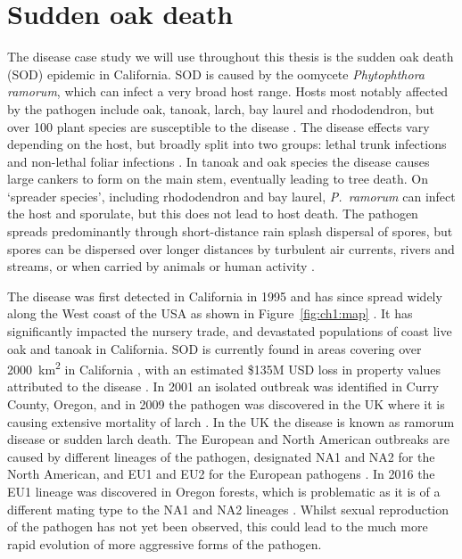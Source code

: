 \section{Sudden oak death}

The disease case study we will use throughout this thesis is the sudden oak death (SOD) epidemic in California. SOD is caused by the oomycete \emph{Phytophthora ramorum}, which can infect a very broad host range. Hosts most notably affected by the pathogen include oak, tanoak, larch, bay laurel and rhododendron, but over 100 plant species are susceptible to the disease \citep{grunwald_emergence_2012}. The disease effects vary depending on the host, but broadly split into two groups: lethal trunk infections and non-lethal foliar infections \citep{rizzo_sudden_2003}. In tanoak and oak species the disease causes large cankers to form on the main stem, eventually leading to tree death. On `spreader species', including rhododendron and bay laurel, \emph{P.~ramorum} can infect the host and sporulate, but this does not lead to host death. The pathogen spreads predominantly through short-distance rain splash dispersal of spores, but spores can be dispersed over longer distances by turbulent air currents, rivers and streams, or when carried by animals or human activity \citep{grunwald_emergence_2012}.

The disease was first detected in California in 1995 and has since spread widely along the West coast of the USA as shown in Figure~\ref{fig:ch1:map} \citep{rizzo_sudden_2003, meentemeyer_epidemiological_2011}. It has significantly impacted the nursery trade, and devastated populations of coast live oak and tanoak in California. SOD is currently found in areas covering over \SI{2000}{\km\squared} in California \citep{grunwald_ecology_2019}, with an estimated \$135M USD loss in property values attributed to the disease \citep{kovacs_predicting_2011}. In 2001 an isolated outbreak was identified in Curry County, Oregon, and in 2009 the pathogen was discovered in the UK where it is causing extensive mortality of larch \citep{brasier_plant_2010}. In the UK the disease is known as ramorum disease or sudden larch death. The European and North American outbreaks are caused by different lineages of the pathogen, designated NA1 and NA2 for the North American, and EU1 and EU2 for the European pathogens \citep{grunwald_emergence_2012}. In 2016 the EU1 lineage was discovered in Oregon forests, which is problematic as it is of a different mating type to the NA1 and NA2 lineages \citep{grunwald_ecology_2019}. Whilst sexual reproduction of the pathogen has not yet been observed, this could lead to the much more rapid evolution of more aggressive forms of the pathogen.

